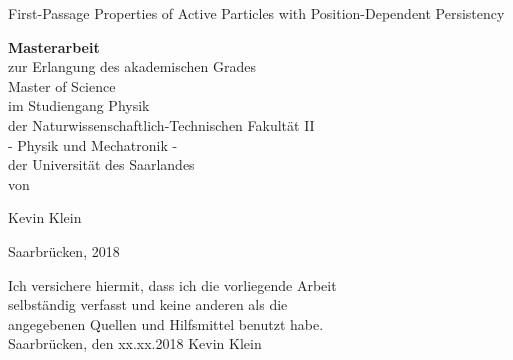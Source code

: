 \documentclass{thesis}
\begin{document}
 
\pagestyle{empty} %
 
\begin{center}
\begin{bfseries}
\begin{Huge}
First-Passage Properties of Active Particles with Position-Dependent Persistency\\
\end{Huge}
\end{bfseries}
\vspace{4cm}
\textbf{Masterarbeit}\\
\vspace{0.4cm}
zur Erlangung des akademischen Grades\\ 
Master of Science  \\
im Studiengang Physik \\
der Naturwissenschaftlich-Technischen Fakultät II \\
- Physik und Mechatronik -  \\
der Universität des Saarlandes \\
\vspace{4 cm}
von\\
\vspace{0.5cm}
\begin{Large}
Kevin Klein \\
\end{Large}
\vspace{1.5cm}
Saarbrücken, 2018
\end{center}
\clearpage

\newpage 
\thispagestyle{empty}
\quad  %
\newpage

\null\vfill
\begin{center}
Ich versichere hiermit, dass ich die vorliegende Arbeit \\
selbständig verfasst und keine anderen als die \\
angegebenen Quellen und Hilfsmittel benutzt habe.\\


\vspace{4cm}
Saarbrücken, den xx.xx.2018 \hspace{4cm} Kevin Klein\\
\end{center}
\vfill


\tableofcontents %
\listoffigures %
\listoftables %
\end{document}
